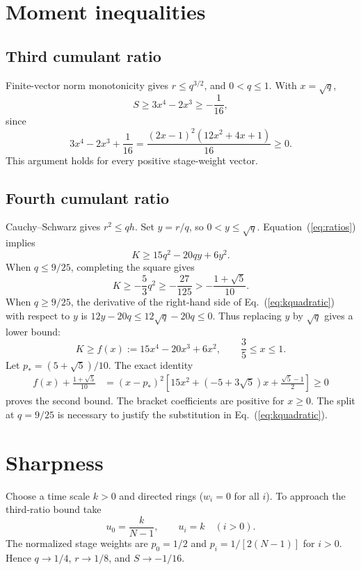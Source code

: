 \documentclass[aps,pre,preprint,superscriptaddress,nofootinbib]{revtex4-2}
\begin{document}
\section{Moment inequalities}
\subsection{Third cumulant ratio}
Finite-vector norm monotonicity gives $r\leq q^{3/2}$, and $0<q\leq1$. With $x=\sqrt q$,
\begin{equation}
 S\geq3x^4-2x^3\geq-\frac1{16},
\end{equation}
since
\begin{equation}
 3x^4-2x^3+\frac1{16}
 =\frac{(2x-1)^2(12x^2+4x+1)}{16}\geq0.
\end{equation}
This argument holds for every positive stage-weight vector.

\subsection{Fourth cumulant ratio}
Cauchy--Schwarz gives $r^2\leq qh$. Set $y=r/q$, so $0<y\leq\sqrt q$. Equation~(\ref{eq:ratios}) implies
\begin{equation}
 K\geq15q^2-20qy+6y^2.
 \label{eq:kquadratic}
\end{equation}
When $q\leq9/25$, completing the square gives
\begin{equation}
 K\geq-\frac53q^2\geq-\frac{27}{125}
 >-\frac{1+\sqrt5}{10}.
\end{equation}
When $q\geq9/25$, the derivative of the right-hand side of Eq.~(\ref{eq:kquadratic}) with respect to $y$ is
$12y-20q\leq12\sqrt q-20q\leq0$.
Thus replacing $y$ by $\sqrt q$ gives a lower bound:
\begin{equation}
 K\geq f(x):=15x^4-20x^3+6x^2,\qquad \frac35\leq x\leq1.
\end{equation}
Let $p_*=(5+\sqrt5)/10$. The exact identity
\begin{align}
 f(x)+\frac{1+\sqrt5}{10}
 &=(x-p_*)^2
 \left[15x^2+(-5+3\sqrt5)x+\frac{\sqrt5-1}{2}\right]
 \geq0
\end{align}
proves the second bound. The bracket coefficients are positive for $x\geq0$.
The split at $q=9/25$ is necessary to justify the substitution in Eq.~(\ref{eq:kquadratic}).

\section{Sharpness}
Choose a time scale $k>0$ and directed rings ($w_i=0$ for all $i$). To approach the third-ratio bound take
\begin{equation}
 u_0=\frac{k}{N-1},\qquad u_i=k\quad(i>0).
\end{equation}
The normalized stage weights are $p_0=1/2$ and $p_i=1/[2(N-1)]$ for $i>0$. Hence $q\to1/4$, $r\to1/8$, and $S\to-1/16$.
\end{document}
